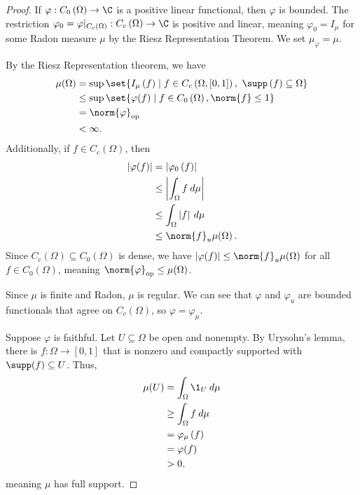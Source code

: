 \documentclass[10pt]{mypackage}
\begin{document}
\begin{proof}
  If $\varphi: C_0\left(\Omega\right)\rightarrow \C$ is a positive linear functional, then $\varphi$ is bounded. The restriction $\varphi_0 = \varphi|_{C_c\left(\Omega\right)}: C_c\left(\Omega\right)\rightarrow \C$ is positive and linear, meaning $\varphi_0 = I_{\mu}$ for some Radon measure $\mu$ by the Riesz Representation Theorem. We set $\mu_{\varphi} = \mu$.\newline

  By the Riesz Representation theorem, we have
  \begin{align*}
    \mu\!\left(\Omega\right) &= \sup\set{I_{\mu}\left(f\right)\mid f\in C_c\left(\Omega,[0,1]\right),~\supp\left(f\right) \subseteq \Omega}\\
                             &\leq \sup\set{\varphi(f)\mid f\in C_0\left(\Omega\right),\norm{f}\leq 1}\\
                             &= \norm{\varphi}_{\text{op}}\\
                             &< \infty.
  \end{align*}
  Additionally, if $f\in C_c\left(\Omega\right)$, then
  \begin{align*}
    \left\vert \varphi(f) \right\vert &= \left\vert \varphi_0\left(f\right) \right\vert\\
                                      &\leq \left\vert \int_{\Omega}f\:d\mu \right\vert\\
                                      &\leq \int_{\Omega}\left\vert f \right\vert\:d\mu\\
                                      &\leq \norm{f}_{u}\mu\!\left(\Omega\right).
  \end{align*}
  Since $C_c\left(\Omega\right)\subseteq C_0\left(\Omega\right)$ is dense, we have $\left\vert \varphi(f) \right\vert\leq \norm{f}_u\mu\!\left(\Omega\right)$ for all $f\in C_0\left(\Omega\right)$, meaning $\norm{\varphi}_{\text{op}}\leq \mu\!\left(\Omega\right)$.\newline

  Since $\mu$ is finite and Radon, $\mu$ is regular. We can see that $\varphi$ and $\varphi_u$ are bounded functionals that agree on $C_c\left(\Omega\right)$, so $\varphi = \varphi_{\mu}$.\newline

  Suppose $\varphi$ is faithful. Let $U\subseteq \Omega$ be open and nonempty. By Urysohn's lemma, there is $f: \Omega\rightarrow [0,1]$ that is nonzero and compactly supported with $\supp(f) \subseteq U$. Thus,
  \begin{align*}
    \mu\!\left(U\right) &= \int_{\Omega}\1_{U}\:d\mu\\
                        &\geq \int_{\Omega}f\:d\mu\\
                        &= \varphi_{\mu}\left(f\right)\\
                        &= \varphi(f)\\
                        &> 0,
  \end{align*}
  meaning $\mu$ has full support.
\end{proof}
\end{document}
